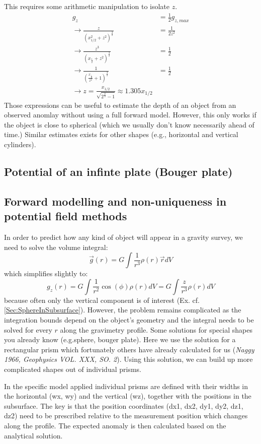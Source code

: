 \documentclass[a4paper,12pt]{article}
\begin{document}
\begin{tcolorbox}[enhanced jigsaw,breakable,pad at break*=1mm,
    colback=blue!5!white,colframe=babyblueeyes,title=Solutions]
This requires some arithmetic manipulation to isolate $z$.
\begin{eqnarray*}
g_z &=\frac{1}{2}g_{z,max} \\
\rightarrow \frac{z}{(x^2_{1/2}+z^2)^\frac{3}{2}} &= \frac{1}{2z^2}\\
\rightarrow \frac{z^3}{(x_{\frac{1}{2}}+z^2)^\frac{3}{2}}&= \frac{1}{2}\\
\rightarrow \frac{1}{(\frac{x_{\frac{1}{2}}}{z^2}+1)^\frac{3}{2}}&= \frac{1}{2}\\
\rightarrow z = \frac{x_{1/2}}{\sqrt{2^{\frac{2}{3}}-1}}\approx 1.305 x_{1/2}
\end{eqnarray*}
Those expressions can be useful to estimate the depth of an object from an observed anomlay without using a full forward model. However, this only works if the object is close to spherical (which we usually don't know necessarily ahead of time.) Similar estimates exists for other shapes (e.g., horizontal and vertical cylinders).
\end{tcolorbox}
\fi
\pagebreak
\subsection{Potential of an infinte plate (Bouger plate)}
\pagebreak


\subsection{Forward modelling and non-uniqueness in potential field methods}
\label{Sec:GravityForwardModelling}
In order to predict how any kind of object will appear in a gravity survey, we need to solve the volume integral:
$$
 \vec{g}(r) = G\int \frac{1}{r^3} \rho(r) \vec{r} dV 
$$
which simplifies slightly to:
$$
 g_z(r) = G\int \frac{1}{r^2} \cos(\phi)\rho(r) dV = G\int \frac{z}{r^3} \rho(r) dV
$$
because often only the vertical component is of interest (Ex. cf. \ref{Sec:SphereInSubsurface}).
However, the problem remains complicated as the integration bounds depend on the object's geometry and the integral needs to be solved for every $r$ along the gravimetry profile. Some solutions for special shapes you already know (e.g.sphere, bouger plate). Here we use the solution for a rectangular prism which fortunately others have already calculated for us (\textit{Naggy 1966, Geophysics VOL. XXX, SO. 2}). Using this solution, we can build up more complicated shapes out of individual prisms.

In the specific model applied individual prisms are defined with their widths in the horizontal (wx, wy) and the vertical (wz), together with the positions in the subsurface. The key is that the position coordinates (dx1, dx2, dy1, dy2, dz1, dz2) need to be prescribed relative to the measurement position which changes along the profile. The expected anomaly is then calculated based on the analytical solution.
\end{document}
